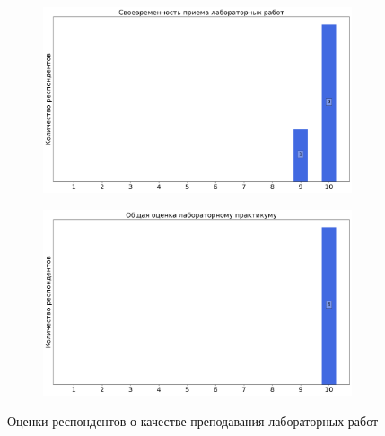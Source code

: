 \begin{figure}[H]
\begin{subfigure}[b]{0.45\textwidth}
				\includegraphics[width=\textwidth]{images/2 course/Общая физика - электричество и магнетизм/labniks-marks-Горемыкин И.А.-2.png}
			\end{subfigure}
			\begin{subfigure}[b]{0.45\textwidth}
				\centering
				\includegraphics[width=\textwidth]{images/2 course/Общая физика - электричество и магнетизм/labniks-marks-Горемыкин И.А.-3.png}
			\end{subfigure}	
			\caption{Оценки респондентов о качестве преподавания лабораторных работ}
		\end{figure}

